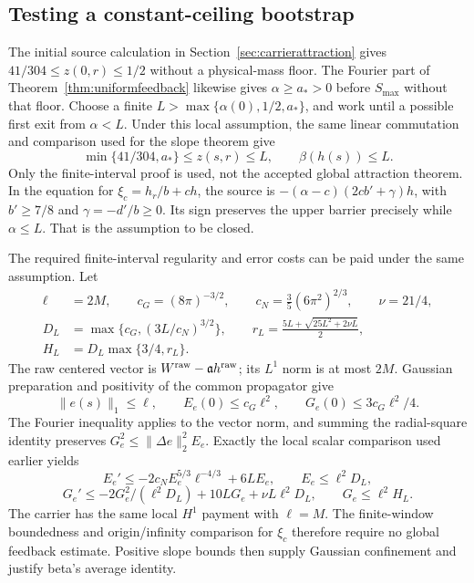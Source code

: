 \documentclass[11pt]{article}
\numberwithin{equation}{section}
\begin{document}
\subsection{Testing a constant-ceiling bootstrap}

The initial source calculation in Section~\ref{sec:carrierattraction}
gives $41/304\le z(0,r)\le1/2$ without a physical-mass floor.
The Fourier part of Theorem~\ref{thm:uniformfeedback} likewise gives
$\alpha\ge a_*>0$ before $S_{\max}$ without that floor. Choose a finite
$L>\max\{\alpha(0),1/2,a_*\}$, and work until a possible first exit
from $\alpha<L$. Under this local assumption, the same linear
commutation and comparison used for the slope theorem give
\[
 \min\{41/304,a_*\}\le z(s,r)\le L,\qquad \beta(h(s))\le L.
\]
Only the finite-interval proof is used, not the accepted global
attraction theorem. In the equation for $\xi_c=h_r/b+ch$, the source is
$-(\alpha-c)(2cb'+\gamma)h$, with $b'\ge7/8$ and $\gamma=-d'/b\ge0$.
Its sign preserves the upper barrier precisely while $\alpha\le L$.
That is the assumption to be closed.

The required finite-interval regularity and error costs can be paid
under the same assumption. Let
\begin{align}
 \ell&=2M,\qquad c_G=(8\pi)^{-3/2},\qquad
 c_N=\tfrac35(6\pi^2)^{2/3},\qquad\nu=21/4,\nonumber\\
 D_L&=\max\{c_G,(3L/c_N)^{3/2}\},\qquad
 r_L=\frac{5L+\sqrt{25L^2+2\nu L}}2,\nonumber\\
 H_L&=D_L\max\{3/4,r_L\}.
 \label{r16:localconstants}
\end{align}
The raw centered vector is $W^{\rm raw}-\mathfrak ah^{\rm raw}$;
its $L^1$ norm is at most $2M$. Gaussian preparation and positivity of
the common propagator give
\[
 \|e(s)\|_1\le\ell,\qquad
 E_e(0)\le c_G\ell^2,\qquad G_e(0)\le3c_G\ell^2/4.
\]
The Fourier inequality applies to the vector norm, and summing the
radial-square identity preserves $G_e^2\le\|\Delta e\|_2^2E_e$.
Exactly the local scalar comparison used earlier yields
\[
 E_e'\le-2c_NE_e^{5/3}\ell^{-4/3}+6LE_e,\qquad
 E_e\le\ell^2D_L,
\]
\[
 G_e'\le-2G_e^2/(\ell^2D_L)+10LG_e+\nu L\ell^2D_L,
 \qquad G_e\le\ell^2H_L.
\]
The carrier has the same local $H^1$ payment with $\ell=M$. The
finite-window boundedness and origin/infinity comparison for $\xi_c$
therefore require no global feedback estimate. Positive slope bounds
then supply Gaussian confinement and justify beta's average identity.
\end{document}
